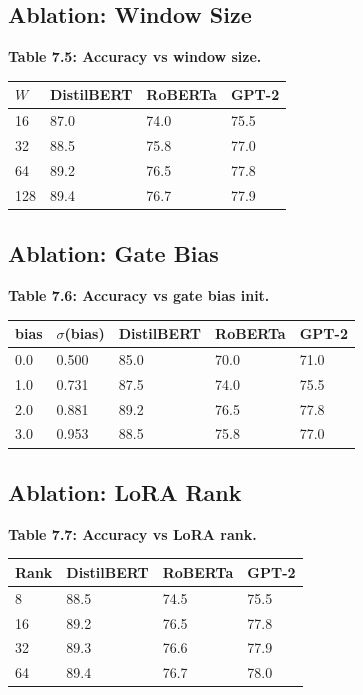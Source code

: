 \subsection{Ablation: Window Size}

\textbf{Table 7.5: Accuracy vs window size.}

\begin{table}[H]
\centering
\small
\begin{tabular}{llll}
\toprule
\textbf{$W$} & \textbf{DistilBERT} & \textbf{RoBERTa} & \textbf{GPT-2} \\
\midrule
16 & 87.0 & 74.0 & 75.5 \\
32 & 88.5 & 75.8 & 77.0 \\
64 & 89.2 & 76.5 & 77.8 \\
128 & 89.4 & 76.7 & 77.9 \\
\bottomrule
\end{tabular}
\end{table}

\subsection{Ablation: Gate Bias}

\textbf{Table 7.6: Accuracy vs gate bias init.}

\begin{table}[H]
\centering
\small
\begin{tabular}{lllll}
\toprule
\textbf{bias} & \textbf{$\sigma$(bias)} & \textbf{DistilBERT} & \textbf{RoBERTa} & \textbf{GPT-2} \\
\midrule
0.0 & 0.500 & 85.0 & 70.0 & 71.0 \\
1.0 & 0.731 & 87.5 & 74.0 & 75.5 \\
2.0 & 0.881 & 89.2 & 76.5 & 77.8 \\
3.0 & 0.953 & 88.5 & 75.8 & 77.0 \\
\bottomrule
\end{tabular}
\end{table}

\subsection{Ablation: LoRA Rank}

\textbf{Table 7.7: Accuracy vs LoRA rank.}

\begin{table}[H]
\centering
\small
\begin{tabular}{llll}
\toprule
\textbf{Rank} & \textbf{DistilBERT} & \textbf{RoBERTa} & \textbf{GPT-2} \\
\midrule
8 & 88.5 & 74.5 & 75.5 \\
16 & 89.2 & 76.5 & 77.8 \\
32 & 89.3 & 76.6 & 77.9 \\
64 & 89.4 & 76.7 & 78.0 \\
\bottomrule
\end{tabular}
\end{table}

